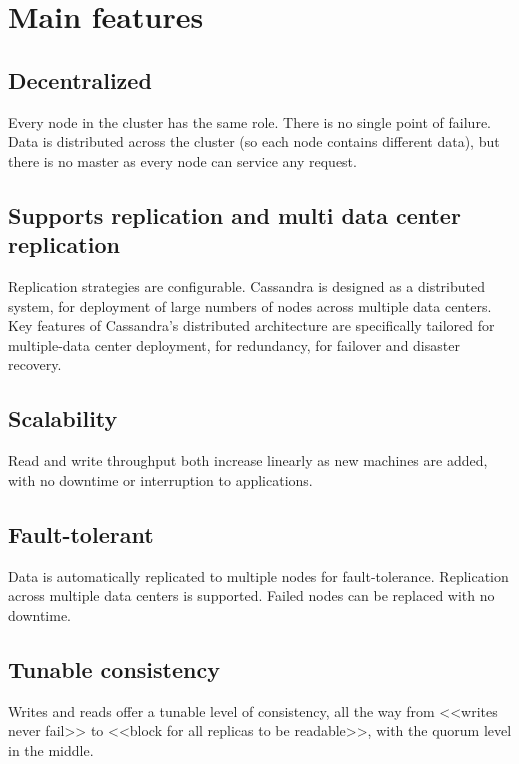 \section{Main features}

\subsection{Decentralized}

Every node in the cluster has the same role. There is no single point of failure. Data is distributed across the cluster (so each node contains different data), but there is no master as every node can service any request.

\subsection{Supports replication and multi data center replication}

Replication strategies are configurable. Cassandra is designed as a distributed system, for deployment of large numbers of nodes across multiple data centers. Key features of Cassandra’s distributed architecture are specifically tailored for multiple-data center deployment, for redundancy, for failover and disaster recovery.

\subsection{Scalability}

Read and write throughput both increase linearly as new machines are added, with no downtime or interruption to applications.

\subsection{Fault-tolerant}

Data is automatically replicated to multiple nodes for fault-tolerance. Replication across multiple data centers is supported. Failed nodes can be replaced with no downtime.

\subsection{Tunable consistency}

Writes and reads offer a tunable level of consistency, all the way from <<writes never fail>> to <<block for all replicas to be readable>>, with the quorum level in the middle.

